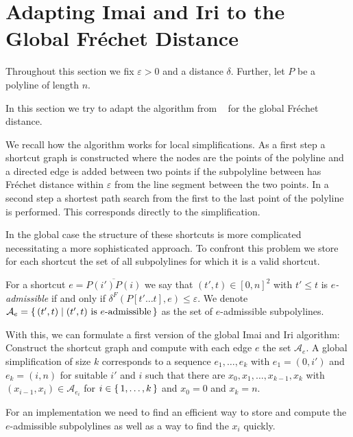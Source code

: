\section{Adapting Imai and Iri to the Global Fréchet Distance}

Throughout this section we fix \(\varepsilon > 0\) and a distance \(\delta\). Further, let \(P\) be a polyline of length \(n\).

In this section we try to adapt the algorithm from \citeauthor{computational_geometric_methods_for_polygonal_approximations_of_a_curve}~\cite{computational_geometric_methods_for_polygonal_approximations_of_a_curve} for the global Fréchet distance. 

We recall how the algorithm works for local simplifications. As a first step a shortcut graph is constructed where the nodes are the points of the polyline and a directed edge is added between two points if the subpolyline between has Fréchet distance within \(\varepsilon\) from the line segment between the two points. In a second step a shortest path search from the first to the last point of the polyline is performed. This corresponds directly to the simplification.

In the global case the structure of these shortcuts is more complicated necessitating a more sophisticated approach. To confront this problem we store for each shortcut the set of all subpolylines for which it is a valid shortcut. 

\begin{definition}
  For a shortcut \(e = \overline{P(i')P(i)}\) we say that \((t', t) \in [0, n]^2\) with \(t' \leq t\) is \emph{\(e\)-admissible} if and only if \(\delta^F(P[t' \dots t], e) \leq \varepsilon\). We denote \(\mathcal{A}_e = \set{(t', t) \mid (t', t) \textrm{ is } e\textrm{-admissible}}\) as the set of \(e\)-admissible subpolylines.
\end{definition}

With this, we can formulate a first version of the global Imai and Iri algorithm: Construct the shortcut graph and compute with each edge \(e\) the set \(\mathcal{A}_e\). A global simplification of size \(k\) corresponds to a sequence \(e_1, \dots, e_k\) with \(e_1 = (0, i')\) and \(e_k = (i, n)\) for suitable \(i'\) and \(i\) such that there are \(x_0, x_1, \dots, x_{k-1}, x_k\) with \((x_{i-1}, x_{i}) \in \mathcal{A}_{e_i}\) for \(i \in \set{1, \dots, k}\) and \(x_0 = 0\) and \(x_k = n\).

For an implementation we need to find an efficient way to store and compute the \(e\)-admissible subpolylines as well as a way to find the \(x_i\) quickly. 

